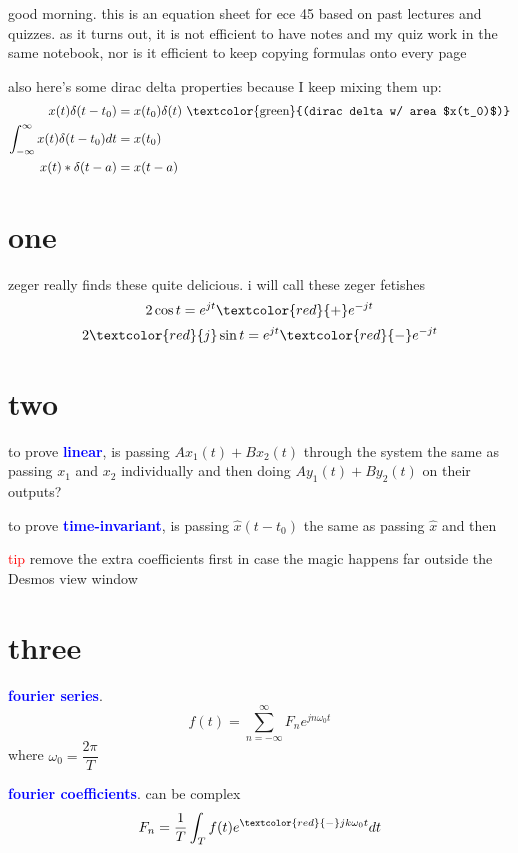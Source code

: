 \documentclass[a5paper, fleqn]{article}
\newcommand{\vocab}[1]{\textbf{\textcolor{blue}{#1}}}
\newcommand{\emf}[1]{\textcolor{red}{#1}}
\newcommand{\note}[1]{\textcolor{green}{#1}}
\newcommand{\wrap}{\hangpara{0.5cm}{1}}
\begin{document}
good morning. this is an equation sheet for ece 45 based on past lectures and quizzes. as it turns out, it is not efficient to have notes and my quiz work in the same notebook, nor is it efficient to keep copying formulas onto every page

also here's some dirac delta properties because I keep mixing them up:
\begin{align*}
  x(t) \delta(t - t_0)                          & = x(t_0) \delta(t) ~ \text{\note{(dirac delta w/ area $x(t_0)$)}} \\
  \int_{-\infty}^\infty x(t) \delta(t - t_0) dt & = x(t_0)                                                          \\
  x(t) * \delta(t - a)                          & = x(t - a)
\end{align*}

\section*{\textcolor{primary}{one}}

zeger really finds these quite delicious. i will call these zeger fetishes
\[2 \cos t = e^{jt} \emf{+} e^{-jt}\]
\[2\emf{j} \sin t = e^{jt} \emf{-} e^{-jt}\]

\section*{\textcolor{primary}{two}}

\wrap to prove \vocab{linear}, is passing $Ax_1(t) + Bx_2(t)$ through the system the same as passing $x_1$ and $x_2$ individually and then doing $Ay_1(t) + By_2(t)$ on their outputs?

\wrap to prove \vocab{time-invariant}, is passing $\hat{x}(t - t_0)$ the same as passing $\hat{x}$ and then

\wrap \emf{tip} remove the extra coefficients first in case the magic happens far outside the Desmos view window

\section*{\textcolor{primary}{three}}

\vocab{fourier series}.
\[f(t) = \sum_{n = -\infty}^{\infty} F_n e^{jn\omega_0 t}\]
where $\omega_0 = \dfrac{2\pi}{T}$

\vocab{fourier coefficients}. can be complex
\[F_n = \frac{1}{T} \int_T f(t) e^{\emf{-}jk\omega_0 t} dt\]
\end{document}
